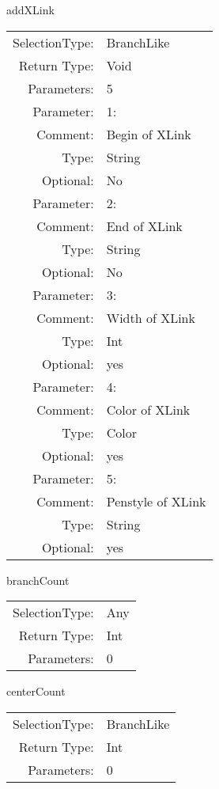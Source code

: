 \item addXLink\\
\begin{tabular}{rl}
  SelectionType: & BranchLike\\
    Return Type: & Void\\
     Parameters: & 5\\
   Parameter: &  1:\\
        Comment: & Begin of XLink\\
           Type: & String\\
       Optional: &  No\\
   Parameter: &  2:\\
        Comment: & End of XLink\\
           Type: & String\\
       Optional: &  No\\
   Parameter: &  3:\\
        Comment: & Width of XLink\\
           Type: & Int\\
       Optional: &  yes\\
   Parameter: &  4:\\
        Comment: & Color of XLink\\
           Type: & Color\\
       Optional: &  yes\\
   Parameter: &  5:\\
        Comment: & Penstyle of XLink\\
           Type: & String\\
       Optional: &  yes\\
\end{tabular}

\item branchCount\\
\begin{tabular}{rl}
  SelectionType: & Any\\
    Return Type: & Int\\
     Parameters: & 0\\
\end{tabular}

\item centerCount\\
\begin{tabular}{rl}
  SelectionType: & BranchLike\\
    Return Type: & Int\\
     Parameters: & 0\\
\end{tabular}

